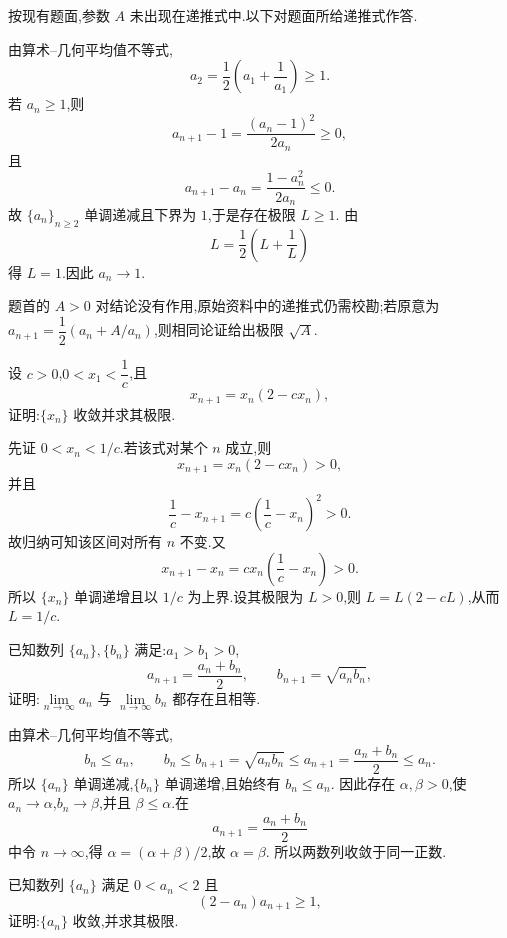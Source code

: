 \begin{solution}
  按现有题面,参数 $A$ 未出现在递推式中.以下对题面所给递推式作答.

  由算术--几何平均值不等式,
  \[
    a_2=\dfrac{1}{2}\left(a_1+\dfrac{1}{a_1}\right)\geq1.
  \]
  若 $a_n\geq1$,则
  \[
    a_{n+1}-1=\dfrac{(a_n-1)^2}{2a_n}\geq0,
  \]
  且
  \[
    a_{n+1}-a_n=\dfrac{1-a_n^2}{2a_n}\leq0.
  \]
  故 $\{a_n\}_{n\geq2}$ 单调递减且下界为 $1$,于是存在极限 $L\geq1$.
  由
  \[
    L=\dfrac{1}{2}\left(L+\dfrac{1}{L}\right)
  \]
  得 $L=1$.因此 $a_n\to1$.

  题首的 $A>0$ 对结论没有作用,原始资料中的递推式仍需校勘;若原意为
  $a_{n+1}=\dfrac{1}{2}(a_n+A/a_n)$,则相同论证给出极限 $\sqrt A$.
\end{solution}

\begin{example}
  设 $c>0$,$0<x_1<\dfrac{1}{c}$,且
  \[
    x_{n+1}=x_n(2-cx_n),
  \]
  证明:$\{x_n\}$ 收敛并求其极限.
\end{example}
\exampleblank

\begin{solution}
  先证 $0<x_n<1/c$.若该式对某个 $n$ 成立,则
  \[
    x_{n+1}=x_n(2-cx_n)>0,
  \]
  并且
  \[
    \dfrac{1}{c}-x_{n+1}
    =c\left(\dfrac{1}{c}-x_n\right)^2>0.
  \]
  故归纳可知该区间对所有 $n$ 不变.又
  \[
    x_{n+1}-x_n
    =cx_n\left(\dfrac{1}{c}-x_n\right)>0.
  \]
  所以 $\{x_n\}$ 单调递增且以 $1/c$ 为上界.设其极限为 $L>0$,则
  $L=L(2-cL)$,从而 $L=1/c$.
\end{solution}

\begin{example}
  已知数列 $\{a_n\},\{b_n\}$ 满足:$a_1>b_1>0$,
  \[
    a_{n+1}=\dfrac{a_n+b_n}{2},
    \qquad
    b_{n+1}=\sqrt{a_nb_n},
  \]
  证明:$\displaystyle \lim\limits_{n\to\infty}a_n$ 与 $\displaystyle \lim\limits_{n\to\infty}b_n$ 都存在且相等.
\end{example}
\exampleblank

\begin{solution}
  由算术--几何平均值不等式,
  \[
    b_n\leq a_n,
    \qquad
    b_n\leq b_{n+1}=\sqrt{a_nb_n}\leq a_{n+1}=\dfrac{a_n+b_n}{2}\leq a_n.
  \]
  所以 $\{a_n\}$ 单调递减,$\{b_n\}$ 单调递增,且始终有 $b_n\leq a_n$.
  因此存在 $\alpha,\beta>0$,使 $a_n\to\alpha$,$b_n\to\beta$,并且
  $\beta\leq\alpha$.在
  \[
    a_{n+1}=\dfrac{a_n+b_n}{2}
  \]
  中令 $n\to\infty$,得 $\alpha=(\alpha+\beta)/2$,故 $\alpha=\beta$.
  所以两数列收敛于同一正数.
\end{solution}

\begin{example}
  已知数列 $\{a_n\}$ 满足 $0<a_n<2$ 且
  \[
    (2-a_n)a_{n+1}\geq1,
  \]
  证明:$\{a_n\}$ 收敛,并求其极限.
\end{example}
\exampleblank

